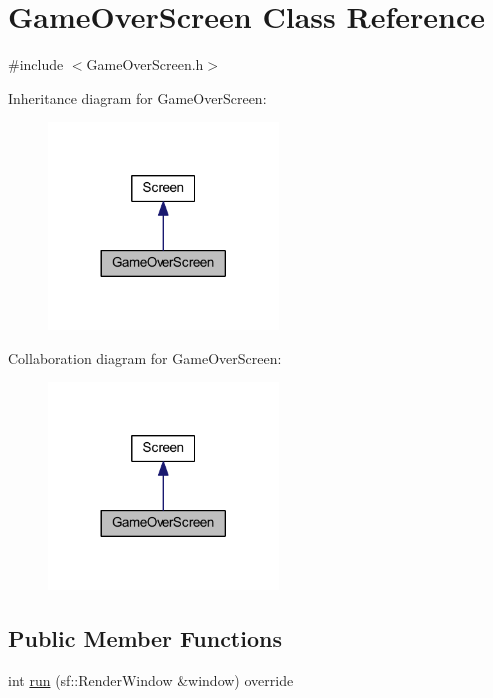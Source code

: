 \hypertarget{class_game_over_screen}{}\section{Game\+Over\+Screen Class Reference}
\label{class_game_over_screen}


{\ttfamily \#include $<$Game\+Over\+Screen.\+h$>$}



Inheritance diagram for Game\+Over\+Screen\+:
\nopagebreak
\begin{figure}[H]
\begin{center}
\leavevmode
\includegraphics[width=173pt]{class_game_over_screen__inherit__graph}
\end{center}
\end{figure}


Collaboration diagram for Game\+Over\+Screen\+:
\nopagebreak
\begin{figure}[H]
\begin{center}
\leavevmode
\includegraphics[width=173pt]{class_game_over_screen__coll__graph}
\end{center}
\end{figure}
\subsection*{Public Member Functions}
\begin{DoxyCompactItemize}
\item 
int \hyperlink{class_game_over_screen_aff38f34b95835895e285c735c5c9f3c7}{run} (sf\+::\+Render\+Window \&window) override
\end{DoxyCompactItemize}


